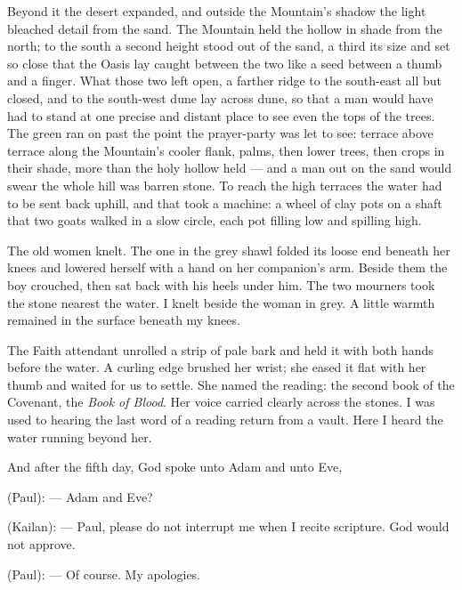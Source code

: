 Beyond it the desert expanded, and outside the Mountain's shadow the light bleached detail from the sand. The Mountain held the hollow in shade from the north; to the south a second height stood out of the sand, a third its size and set so close that the Oasis lay caught between the two like a seed between a thumb and a finger. What those two left open, a farther ridge to the south-east all but closed, and to the south-west dune lay across dune, so that a man would have had to stand at one precise and distant place to see even the tops of the trees. The green ran on past the point the prayer-party was let to see: terrace above terrace along the Mountain's cooler flank, palms, then lower trees, then crops in their shade, more than the holy hollow held --- and a man out on the sand would swear the whole hill was barren stone. To reach the high terraces the water had to be sent back uphill, and that took a machine: a wheel of clay pots on a shaft that two goats walked in a slow circle, each pot filling low and spilling high.\par

The old women knelt. The one in the grey shawl folded its loose end beneath her knees and lowered herself with a hand on her companion's arm. Beside them the boy crouched, then sat back with his heels under him. The two mourners took the stone nearest the water. I knelt beside the woman in grey. A little warmth remained in the surface beneath my knees.\par

The Faith attendant unrolled a strip of pale bark and held it with both hands before the water. A curling edge brushed her wrist; she eased it flat with her thumb and waited for us to settle. She named the reading: the second book of the Covenant, the \textit{Book of Blood}. Her voice carried clearly across the stones. I was used to hearing the last word of a reading return from a vault. Here I heard the water running beyond her.\par

\begin{scripture}
And after the fifth day, God spoke unto Adam and unto Eve,
\end{scripture}

\begin{room}
(Paul): --- Adam and Eve?

(Kailan): --- Paul, please do not interrupt me when I recite scripture. God would not approve.

(Paul): --- Of course. My apologies.
\end{room}

